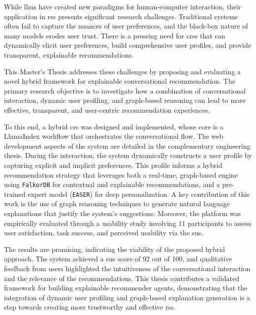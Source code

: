 
While \acp{llm} have created new paradigms for human-computer interaction, their application in \acp{rs} presents significant research challenges. Traditional systems often fail to capture the nuances of user preferences, and the black-box nature of many models erodes user trust. There is a pressing need for \aclp{crs} that can dynamically elicit user preferences, build comprehensive user profiles, and provide transparent, explainable recommendations.

This Master's Thesis addresses these challenges by proposing and evaluating a novel hybrid framework for explainable conversational recommendation. The primary research objective is to investigate how a combination of conversational interaction, dynamic user profiling, and graph-based reasoning can lead to more effective, transparent, and user-centric recommendation experiences.

To this end, a hybrid \acl{crs} was designed and implemented, whose core is a LlamaIndex workflow that orchestrates the conversational flow. The web development aspects of the system are detailed in the complementary engineering thesis. During the interaction, the system dynamically constructs a user profile by capturing explicit and implicit preferences. This profile informs a hybrid recommendation strategy that leverages both a real-time, graph-based engine using \texttt{FalkorDB} for contextual and explainable recommendations, and a pre-trained expert model (\texttt{EASER}) for deep personalization. A key contribution of this work is the use of graph reasoning techniques to generate natural language explanations that justify the system's suggestions. Moreover, the platform was empirically evaluated through a usability study involving 11 participants to assess user satisfaction, task success, and perceived usability via the \ac{sus}.

The results are promising, indicating the viability of the proposed hybrid approach. The system achieved a \acs{sus} score of 92 out of 100, and qualitative feedback from users highlighted the intuitiveness of the conversational interaction and the relevance of the recommendations. This thesis contributes a validated framework for building explainable recommender agents, demonstrating that the integration of dynamic user profiling and graph-based explanation generation is a step towards creating more trustworthy and effective \aclp{rs}.

